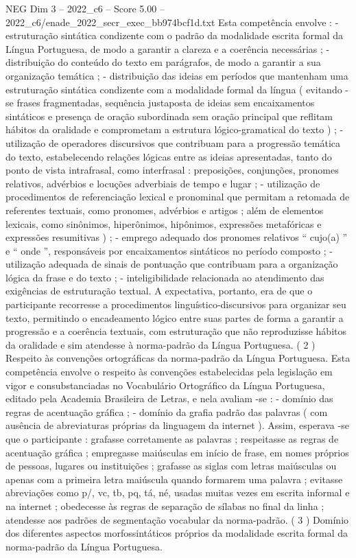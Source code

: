 \begin{textsample}{NEG Dim 3 – 2022\_c6 – Score 5.00 – 2022\_c6/enade\_2022\_secr\_exec\_bb974bcf1d.txt}
Esta competência envolve : - estruturação sintática condizente com o padrão da modalidade escrita formal da Língua Portuguesa, de modo a garantir a clareza e a coerência necessárias ; - distribuição do conteúdo do texto em parágrafos, de modo a garantir a sua organização temática ; - distribuição das ideias em períodos que mantenham uma estruturação sintática condizente com a modalidade formal da língua ( evitando -se frases fragmentadas, sequência justaposta de ideias sem encaixamentos sintáticos e presença de oração subordinada sem oração principal que reflitam hábitos da oralidade e comprometam a estrutura lógico-gramatical do texto ) ; - utilização de operadores discursivos que contribuam para a progressão temática do texto, estabelecendo relações lógicas entre as ideias apresentadas, tanto do ponto de vista intrafrasal, como interfrasal : preposições, conjunções, pronomes relativos, advérbios e locuções adverbiais de tempo e lugar ; - utilização de procedimentos de referenciação lexical e pronominal que permitam a retomada de referentes textuais, como pronomes, advérbios e artigos ; além de elementos lexicais, como sinônimos, hiperônimos, hipônimos, expressões metafóricas e expressões resumitivas ) ; - emprego adequado dos pronomes relativos “ cujo(a) ” e “ onde ”, responsáveis por encaixamentos sintáticos no período composto ; - utilização adequada de sinais de pontuação que contribuam para a organização lógica da frase e do texto ; - inteligibilidade relacionada ao atendimento das exigências de estruturação textual.
A expectativa, portanto, era de que o participante recorresse a procedimentos linguístico-discursivos para organizar seu texto, permitindo o encadeamento lógico entre suas partes de forma a garantir a progressão e a coerência textuais, com estruturação que não reproduzisse hábitos da oralidade e sim atendesse à norma-padrão da Língua Portuguesa. ( 2 ) Respeito às convenções ortográficas da norma-padrão da Língua Portuguesa.
Esta competência envolve o respeito às convenções estabelecidas pela legislação em vigor e consubstanciadas no Vocabulário Ortográfico da Língua Portuguesa, editado pela Academia Brasileira de Letras, e nela avaliam -se : - domínio das regras de acentuação gráfica ; - domínio da grafia padrão das palavras ( com ausência de abreviaturas próprias da linguagem da internet ).
Assim, esperava -se que o participante : grafasse corretamente as palavras ; respeitasse as regras de acentuação gráfica ; empregasse maiúsculas em início de frase, em nomes próprios de pessoas, lugares ou instituições ; grafasse as siglas com letras maiúsculas ou apenas com a primeira letra maiúscula quando formarem uma palavra ; evitasse abreviações como p/, vc, tb, pq, tá, né, usadas muitas vezes em escrita informal e na internet ; obedecesse às regras de separação de sílabas no final da linha ; atendesse aos padrões de segmentação vocabular da norma-padrão. ( 3 ) Domínio dos diferentes aspectos morfossintáticos próprios da modalidade escrita formal da norma-padrão da Língua Portuguesa.

\end{textsample}
